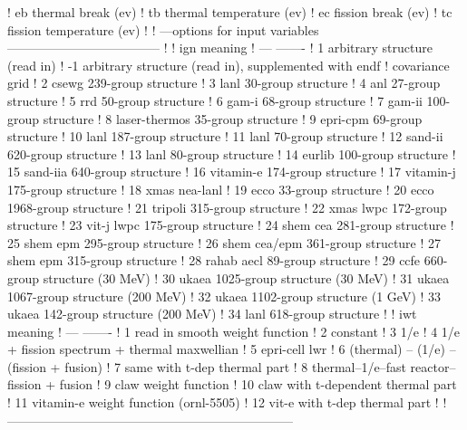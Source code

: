 \begin{ccode}
   !    eb      thermal break (ev)
   !    tb      thermal temperature (ev)
   !    ec      fission break (ev)
   !    tc      fission temperature (ev)
   !
   ! ---options for input variables------------------------------------
   !
   !      ign          meaning
   !      ---          -------
   !       1           arbitrary structure (read in)
   !      -1           arbitrary structure (read in), supplemented with endf
   !                   covariance grid
   !       2           csewg 239-group structure
   !       3           lanl 30-group structure
   !       4           anl 27-group structure
   !       5           rrd 50-group structure
   !       6           gam-i 68-group structure
   !       7           gam-ii 100-group structure
   !       8           laser-thermos 35-group structure
   !       9           epri-cpm 69-group structure
   !      10           lanl 187-group structure
   !      11           lanl 70-group structure
   !      12           sand-ii 620-group structure
   !      13           lanl 80-group structure
   !      14           eurlib 100-group structure
   !      15           sand-iia 640-group structure
   !      16           vitamin-e 174-group structure
   !      17           vitamin-j 175-group structure
   !      18           xmas nea-lanl
   !      19           ecco  33-group structure
   !      20           ecco 1968-group structure
   !      21           tripoli 315-group structure
   !      22           xmas lwpc 172-group structure
   !      23           vit-j lwpc 175-group structure
   !      24           shem cea 281-group structure
   !      25           shem epm 295-group structure
   !      26           shem cea/epm 361-group structure
   !      27           shem epm 315-group structure
   !      28           rahab aecl 89-group structure
   !      29           ccfe   660-group structure  (30 MeV)
   !      30           ukaea 1025-group structure  (30 MeV)
   !      31           ukaea 1067-group structure (200 MeV)
   !      32           ukaea 1102-group structure   (1 GeV)
   !      33           ukaea  142-group structure (200 MeV)
   !      34           lanl 618-group structure
   !
   !      iwt          meaning
   !      ---          -------
   !       1           read in smooth weight function
   !       2           constant
   !       3           1/e
   !       4           1/e + fission spectrum + thermal maxwellian
   !       5           epri-cell lwr
   !       6           (thermal) -- (1/e) -- (fission + fusion)
   !       7           same with t-dep thermal part
   !       8           thermal--1/e--fast reactor--fission + fusion
   !       9           claw weight function
   !      10           claw with t-dependent thermal part
   !      11           vitamin-e weight function (ornl-5505)
   !      12           vit-e with t-dep thermal part
   !
   !--------------------------------------------------------------------

\end{ccode}
\normalsize

